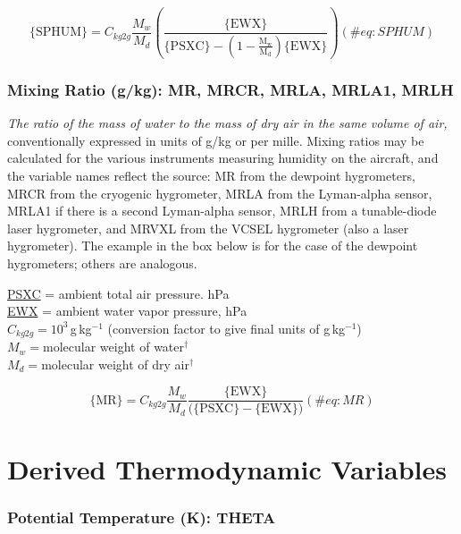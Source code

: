 \documentclass[
  english,
]{book}
\begin{document}
\begin{equation}
\mathrm{\{SPHUM\}} = C_{kg2g}\frac{M_{w}}{M_{d}}(\mathrm{\frac{\{EWX\}}{\mathrm{\{PSXC\}-(1-\frac{M_{w}}{M_{d}})\{\mathrm{EWX}\}}}})
(\#eq:SPHUM)
\end{equation}

\hypertarget{MR}{%
\subsubsection*{Mixing Ratio (g/kg): MR, MRCR, MRLA, MRLA1,
MRLH}\label{MR}}

\emph{The ratio of the mass of water to the mass of dry air in the same
volume of air,} conventionally expressed in units of g/kg or per mille.
Mixing ratios may be calculated for the various instruments measuring
humidity on the aircraft, and the variable names reflect the source: MR
from the dewpoint hygrometers, MRCR from the cryogenic hygrometer, MRLA
from the Lyman-alpha sensor, MRLA1 if there is a second Lyman-alpha
sensor, MRLH from a tunable-diode laser hygrometer, and MRVXL from the
VCSEL hygrometer (also a laser hygrometer). The example in the box below
is for the case of the dewpoint hygrometers; others are analogous.

\protect\hyperlink{psx}{PSXC} = ambient total air pressure. hPa\\
\protect\hyperlink{ewx}{EWX} = ambient water vapor pressure, hPa\\
\(C_{kg2g}=10^{3}\,\)g\(\,\)kg\(^{-1}\) (conversion factor to give final
units of g\(\,\)kg\(^{-1}\))\\
\(M_{w}=\)molecular weight of water\(^{\dagger}\)\\
\(M_{d}=\)molecular weight of dry air\(^{\dagger}\)

\begin{equation}
\mathrm{\{MR\}}=C_{kg2g}\frac{M_{w}}{M_{d}}\frac{\mathrm{\{EWX\}}}{(\mathrm{\{PSXC\}-\{EWX\})}}
(\#eq:MR)
\end{equation}

\hypertarget{derived-thermodynamic-variables}{%
\section{Derived Thermodynamic
Variables}\label{derived-thermodynamic-variables}}

\hypertarget{theta}{%
\subsubsection*{Potential Temperature (K): THETA}\label{theta}}
\end{document}
